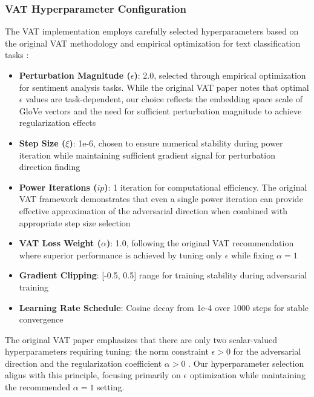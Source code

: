 \documentclass[../main.tex]{subfiles}
\begin{document}
\subsubsection{VAT Hyperparameter Configuration}

The VAT implementation employs carefully selected hyperparameters based on the original VAT methodology and empirical optimization for text classification tasks \cite{miyato2017virtual}:

\begin{itemize}
\item \textbf{Perturbation Magnitude ($\epsilon$)}: 2.0, selected through empirical optimization for sentiment analysis tasks. While the original VAT paper notes that optimal $\epsilon$ values are task-dependent, our choice reflects the embedding space scale of GloVe vectors and the need for sufficient perturbation magnitude to achieve regularization effects \cite{miyato2017virtual}
\item \textbf{Step Size ($\xi$)}: 1e-6, chosen to ensure numerical stability during power iteration while maintaining sufficient gradient signal for perturbation direction finding \cite{miyato2017virtual}
\item \textbf{Power Iterations ($ip$)}: 1 iteration for computational efficiency. The original VAT framework demonstrates that even a single power iteration can provide effective approximation of the adversarial direction when combined with appropriate step size selection \cite{miyato2017virtual}
\item \textbf{VAT Loss Weight ($\alpha$)}: 1.0, following the original VAT recommendation where superior performance is achieved by tuning only $\epsilon$ while fixing $\alpha=1$ \cite{miyato2017virtual}
\item \textbf{Gradient Clipping}: [-0.5, 0.5] range for training stability during adversarial training
\item \textbf{Learning Rate Schedule}: Cosine decay from 1e-4 over 1000 steps for stable convergence
\end{itemize}

The original VAT paper emphasizes that there are only two scalar-valued hyperparameters requiring tuning: the norm constraint $\epsilon > 0$ for the adversarial direction and the regularization coefficient $\alpha > 0$ \cite{miyato2017virtual}. Our hyperparameter selection aligns with this principle, focusing primarily on $\epsilon$ optimization while maintaining the recommended $\alpha=1$ setting.
\end{document}
